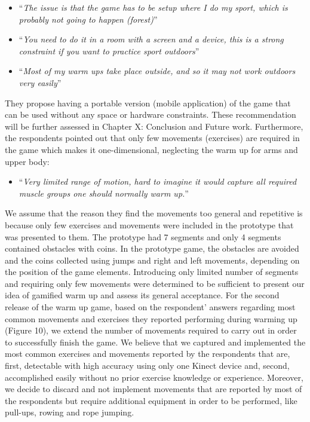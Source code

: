 \begin{itemize}
\item ``\textit{The issue is that the game has to be setup where I do my sport, which is probably not going to happen (forest)}''
\item ``\textit{You need to do it in a room with a screen and a device, this is a strong constraint if you want to practice sport outdoors}''
\item ``\textit{Most of my warm ups take place outside, and so it may not work outdoors very easily}''
\end{itemize}
They propose having a portable version (mobile application) of the game that can be used without any space or hardware constraints. These recommendation will be further assessed in Chapter X: Conclusion and Future work.  Furthermore, the respondents pointed out that only few movements (exercises) are required in the game which makes it one-dimensional, neglecting the warm up for arms and upper body:
\begin{itemize}
\item ``\textit{Very limited range of motion, hard to imagine it would capture all required muscle groups one should normally warm up.}''
\end{itemize}
We assume that the reason they find the movements too general and repetitive is because only few exercises and movements were included in the prototype that was presented to them. The prototype had 7 segments and only 4 segments contained obstacles with coins. In the prototype game, the obstacles are avoided and the coins collected using jumps and right and left movements, depending on the position of the game elements. Introducing only limited number of segments and requiring only few movements were determined to be sufficient to present our idea of gamified warm up and assess its general acceptance. For the second release of the warm up game, based on the respondent' answers regarding most common movements and exercises they reported performing during warming up (Figure 10), we extend the number of movements required to carry out in order to successfully finish the game. We believe that we captured and implemented the most common exercises and movements reported by the respondents that are, first, detectable with high accuracy using only one Kinect device and, second, accomplished easily without no prior exercise knowledge or experience. Moreover, we decide to discard and not implement movements that are reported by most of the respondents but require additional equipment in order to be performed, like pull-ups, rowing and rope jumping. 
